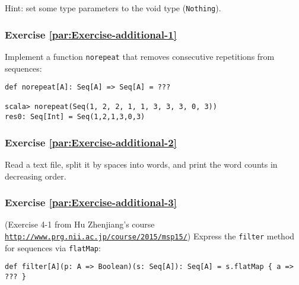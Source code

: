 Hint: set some type parameters to the void type (\lstinline!Nothing!).

\subsubsection{Exercise \label{par:Exercise-additional-1}\ref{par:Exercise-additional-1}}

Implement a function \lstinline!norepeat! that removes consecutive
repetitions from sequences:
\begin{lstlisting}
def norepeat[A]: Seq[A] => Seq[A] = ???

scala> norepeat(Seq(1, 2, 2, 1, 1, 3, 3, 3, 0, 3))
res0: Seq[Int] = Seq(1,2,1,3,0,3)
\end{lstlisting}


\subsubsection{Exercise \label{par:Exercise-additional-2}\ref{par:Exercise-additional-2}}

Read a text file, split it by spaces into words, and print the word
counts in decreasing order.%
\begin{comment}
\begin{enumerate}
\item FPIS exercise 2.2: Check whether a sequence \lstinline!Seq[A]! is
sorted according to a given ordering function of type \lstinline!(A, A) => Boolean!.
\item FPIS exercise 3.24: Implement a function \lstinline!hasSubsequence!
that checks whether a \lstinline!List! contains another \lstinline!List!
as a subsequence. For instance, \lstinline!List(1,2,3,4)! would have
\lstinline!List(1,2)!, \lstinline!List(2,3)!, and \lstinline!List(4)!
as subsequences, among others. (Dynamic programming?)
\end{enumerate}
\end{comment}


\subsubsection{Exercise \label{par:Exercise-additional-3}\ref{par:Exercise-additional-3}}

(Exercise 4-1 from Hu Zhenjiang\textsf{'}s course \texttt{\href{http://www.prg.nii.ac.jp/course/2015/msp15/}{http://www.prg.nii.ac.jp/course/2015/msp15/}})
Express the \lstinline!filter! method for sequences via \lstinline!flatMap!:
\begin{lstlisting}
def filter[A](p: A => Boolean)(s: Seq[A]): Seq[A] = s.flatMap { a => ??? }
\end{lstlisting}


